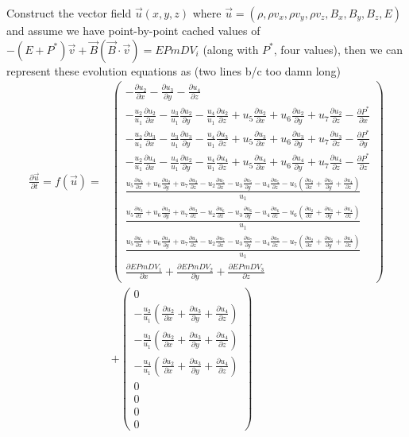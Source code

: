 \documentclass[10pt]{article}
\newcommand{\pd}[2]{\frac{\partial#1}{\partial#2}}
\begin{document}
Construct the vector field $\vec{u}(x,y,z)$ where $\vec{u} = (\rho, \rho v_x, \rho v_y, \rho v_z, B_x, B_y, B_z, E)$ and assume we have point-by-point cached values of $-(E + P^*)\vec{v} + \vec{B}(\vec{B} \cdot \vec{v})  = EPmDV_i$ (along with $P^*$, four values), then we can represent these evolution equations as (two lines b/c too damn long)
\begin{align}
    \pd{\vec{u}}{t} = f(\vec{u}) {}=& \begin{pmatrix} 
        -\pd{u_2}{x} - \pd{u_3}{y} - \pd{u_4}{z}\\[10pt]
        -\frac{u_2}{u_1}\pd{u_2}{x}-\frac{u_3}{u_1}\pd{u_2}{y}-\frac{u_4}{u_1}\pd{u_2}{z} + u_5\pd{u_2}{x} + u_6\pd{u_2}{y} + u_7\pd{u_2}{z} - \pd{P^*}{x}\\[10pt]
        -\frac{u_2}{u_1}\pd{u_3}{x}-\frac{u_3}{u_1}\pd{u_3}{y}-\frac{u_4}{u_1}\pd{u_3}{z} + u_5\pd{u_3}{x} + u_6\pd{u_3}{y} + u_7\pd{u_3}{z} - \pd{P^*}{y}\\[10pt]
        -\frac{u_2}{u_1}\pd{u_4}{x}-\frac{u_4}{u_1}\pd{u_2}{y}-\frac{u_4}{u_1}\pd{u_4}{z} + u_5\pd{u_4}{x} + u_6\pd{u_4}{y} + u_7\pd{u_4}{z} - \pd{P^*}{z}\\[10pt]
        \frac{u_5\pd{u_2}{x} + u_6\pd{u_2}{y} + u_7\pd{u_2}{z} - u_2\pd{u_5}{x} - u_3\pd{u_5}{y} - u_4\pd{u_5}{z} - u_5\left(\pd{u_2}{x} + \pd{u_3}{y} + \pd{u_4}{z}\right)}{u_1}\\[10pt]
        \frac{u_5\pd{u_3}{x} + u_6\pd{u_3}{y} + u_7\pd{u_3}{z} - u_2\pd{u_6}{x} - u_3\pd{u_6}{y} - u_4\pd{u_6}{z} - u_6\left(\pd{u_2}{x} + \pd{u_3}{y} + \pd{u_4}{z}\right)}{u_1}\\[10pt]
        \frac{u_5\pd{u_4}{x} + u_6\pd{u_4}{y} + u_7\pd{u_4}{z} - u_2\pd{u_7}{x} - u_3\pd{u_7}{y} - u_4\pd{u_7}{z} - u_7\left(\pd{u_2}{x} + \pd{u_3}{y} + \pd{u_4}{z}\right)}{u_1}\\[10pt]
        \pd{EPmDV_1}{x} + \pd{EPmDV_2}{y} + \pd{EPmDV_3}{z}
    \end{pmatrix} \nonumber\\
    &+ \begin{pmatrix}
        0\\
        - \frac{u_2}{u_1}\left(\pd{u_2}{x} + \pd{u_3}{y} + \pd{u_4}{z}\right)\\[10pt]
        - \frac{u_3}{u_1}\left(\pd{u_2}{x} + \pd{u_3}{y} + \pd{u_4}{z}\right)\\[10pt]
        - \frac{u_4}{u_1}\left(\pd{u_2}{x} + \pd{u_3}{y} + \pd{u_4}{z}\right)\\[10pt]
        0\\
        0\\
        0\\
        0
    \end{pmatrix}
\end{align}
\end{document}
